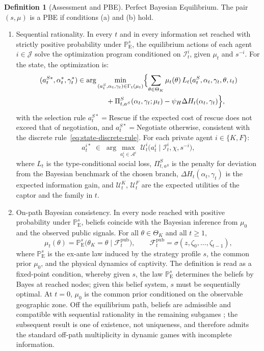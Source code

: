 \documentclass[review,authoryear,12pt]{elsarticle}
\providecommand{\textcite}{\citet}
\theoremstyle{plain}
\theoremstyle{definition}
\newtheorem{definition}[theorem]{Definition}
\newcommand{\ProbE}{\mathbb{P}_{\mathrm{E}}}
\newcommand{\ThetaK}{\Theta_K}
\newcommand{\1}{\mathbf{1}}
\begin{document}
\begin{definition}[Assessment and PBE]
\smallskip
\noindent Perfect Bayesian Equilibrium. The pair $(s,\mu)$ is a PBE if conditions \textup{(a)} and \textup{(b)} hold.
\begin{enumerate}
  \item[\textup{(a)}] Sequential rationality. In every $t$ and in every information set reached with strictly positive probability under $\ProbE^s$, the equilibrium actions of each agent $i\in\mathcal{J}$ solve the optimization program conditioned on $\mathcal{I}_t^i$, given $\mu_t$ and $s^{-i}$. For the state, the optimization is:
  \[
  \begin{aligned}
  (a_t^{S\ast},\alpha_t^\ast,\gamma_t^\ast)
  &\in
  \arg\min_{(a_t^S,\alpha_t,\gamma_t)\in\Gamma_t(\mu_t)}
  \Bigl\{
  \sum_{\theta\in\ThetaK}\mu_t(\theta)\,L_t(a_t^S,\alpha_t,\gamma_t,\theta,\iota_t)\\
  &\qquad\qquad
  +\Pi_{t,a^S}^S(\alpha_t,\gamma_t;\mu_t)-\psi_H\Delta H_t(\alpha_t,\gamma_t)
  \Bigr\},
  \end{aligned}
  \]
  with the selection rule $a_t^{S\ast}=\text{Rescue}$ if the expected cost of rescue does not exceed that of negotiation, and $a_t^{S\ast}=\text{Negotiate}$ otherwise, consistent with the discrete rule~\eqref{eq:state-discrete-rule}. For each private agent $i\in\{K,F\}$:
  \[
  a_t^{i\ast}\;\in\;
  \arg\max_{a_t^i\in\mathcal{A}^i}
  \;\mathcal{U}^i_t\!\bigl(a_t^i\mid \mathcal{I}_t^i,\chi,s^{-i}\bigr),
  \]
  where $L_t$ is the type-conditional social loss, $\Pi_{t,a^S}^S$ is the penalty for deviation from the Bayesian benchmark of the chosen branch, $\Delta H_t(\alpha_t,\gamma_t)$ is the expected information gain, and $\mathcal{U}^K_t$, $\mathcal{U}^F_t$ are the expected utilities of the captor and the family in $t$.

  \item[\textup{(b)}] On-path Bayesian consistency. In every node reached with positive probability under $\ProbE^s$, beliefs coincide with the Bayesian inference from $\mu_0$ and the observed public signals. For all $\theta\in\ThetaK$ and all $t\ge 1$,
  \begin{equation}
  \label{eq:def712-bayes-mu}
  \mu_t(\theta)=\ProbE^s\!\bigl(\theta_K=\theta\mid \mathcal{F}_t^{\mathrm{pub}}\bigr),
  \qquad
  \mathcal{F}_t^{\mathrm{pub}}=\sigma(z,\zeta_0,\ldots,\zeta_{t-1}),
  \end{equation}
  where $\ProbE^s$ is the ex-ante law induced by the strategy profile $s$, the common prior $\mu_0$, and the physical dynamics of captivity. The definition is read as a fixed-point condition, whereby given $s$, the law $\ProbE^s$ determines the beliefs by Bayes at reached nodes; given this belief system, $s$ must be sequentially optimal. At $t=0$, $\mu_0$ is the common prior conditioned on the observable geographic zone. Off the equilibrium path, beliefs are admissible and compatible with sequential rationality in the remaining subgames \textcite{FudenbergTirole1991,KrepsWilson1982}; the subsequent result is one of existence, not uniqueness, and therefore admits the standard off-path multiplicity in dynamic games with incomplete information.
\end{enumerate}
\end{definition}
\end{document}
